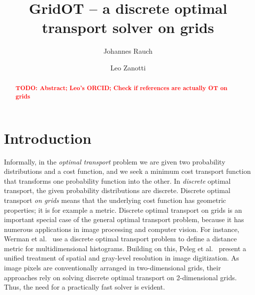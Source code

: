 \documentclass[a4paper,UKenglish,cleveref, autoref, thm-restate]{lipics-v2021}
\title{GridOT -- a discrete optimal transport solver on grids}
\author{Johannes Rauch}
{Ulm University, Institute of Optimization and Operations Research, Germany}
{johannes.rauch@uni-ulm.de}
{https://orcid.org/0000-0002-6925-8830}
{}%
\author{Leo Zanotti}{Ulm University, Institute of Optimization and Operations Research, Germany}{leo.zanotti@uni-ulm.de}{}{}
\begin{document}
\maketitle

\begin{abstract}
\textcolor{red}{\bf TODO: Abstract; Leo's ORCID; Check if references are actually OT on grids}
\end{abstract}

\section{Introduction}\label{sec:intro}
Informally, in the \emph{optimal transport} problem we are given two probability distributions and a cost function, and we seek a minimum cost transport function that transforms one probability function into the other.
In \emph{discrete} optimal transport, the given probability distributions are discrete.
Discrete optimal transport \emph{on grids} means that the underlying cost function has geometric properties; it is for example a metric.
Discrete optimal transport on grids is an important special case of the general optimal transport problem, because it has numerous applications in image processing and computer vision.
For instance, Werman et al.~\cite{werman1985distance} use a discrete optimal transport problem to define a distance metric for multidimensional histograms.
Building on this, Peleg et al.~\cite{peleg1989unified} present a unified treatment of spatial and gray-level resolution in image digitization.
As image pixels are conventionally arranged in two-dimensional grids, their approaches rely on solving discrete optimal transport on 2-dimensional grids.
Thus, the need for a practically fast solver is evident.
\end{document}

